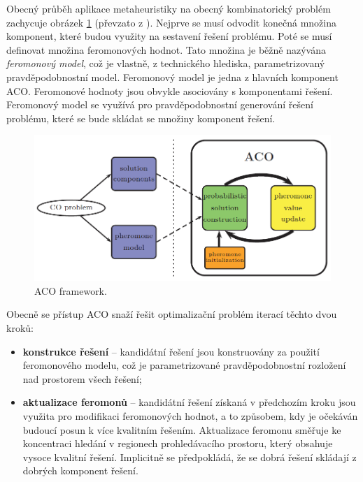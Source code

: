 \documentclass[a4paper,12pt]{article}
\begin{document}
Obecný průběh aplikace metaheuristiky na obecný kombinatorický problém zachycuje obrázek \ref{fig:acofw} (převzato
z \cite{Dorigo06antcolony}). 
Nejprve se musí odvodit konečná množina komponent, které budou využity na sestavení řešení problému.
Poté se musí definovat množina feromonových hodnot. Tato množina je běžně nazývána {\it feromonový model}, což
je vlastně, z technického hlediska, parametrizovaný pravděpodobnostní model. Feromonový model je jedna z
hlavních komponent ACO. Feromonové hodnoty jsou obvykle asociovány s komponentami řešení. Feromonový model
se využívá pro pravděpodobnostní generování řešení problému, které se bude skládat se množiny komponent řešení.

\begin{figure}[here]
  \centering
  \includegraphics[width=14cm]{./img/aco_framework.png}
  \caption{ACO framework.}
  \label{fig:acofw}
\end{figure}

\medskip

Obecně se přístup ACO snaží řešit optimalizační problém iterací těchto dvou kroků:
\begin{itemize}
  \item \textbf{konstrukce řešení} -- kandidátní řešení jsou konstruovány za použití feromonového modelu, což
        je parametrizované pravděpodobnostní rozložení nad prostorem všech řešení;
  \item \textbf{aktualizace feromonů} -- kandidátní řešení získaná v předchozím kroku jsou využita pro modifikaci
        feromonových hodnot, a to způsobem, kdy je očekáván budoucí posun k více kvalitním řešením. Aktualizace
        feromonu směřuje ke koncentraci hledání v regionech prohledávacího prostoru, který obsahuje vysoce kvalitní
        řešení. Implicitně se předpokládá, že se dobrá řešení skládají z dobrých komponent řešení.
\end{itemize}
\end{document}
